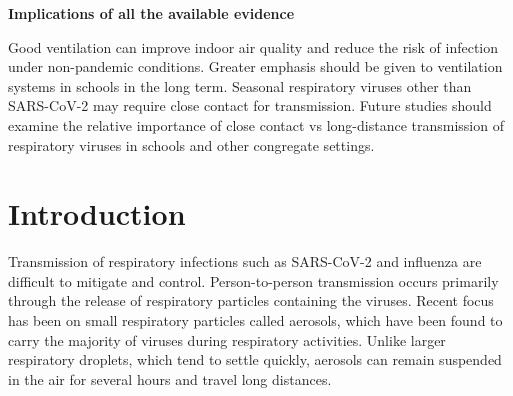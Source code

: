 \documentclass[fleqn,11pt]{wlscirep}
\begin{document}
\noindent \textbf{Implications of all the available evidence} \smallskip

\noindent Good ventilation can improve indoor air quality and reduce the risk of infection under non-pandemic conditions. Greater emphasis should be given to ventilation systems in schools in the long term. Seasonal respiratory viruses other than SARS-CoV-2 may require  close contact for transmission. Future studies should examine the relative importance of close contact vs long-distance transmission of respiratory viruses in schools and other congregate settings.

\thispagestyle{empty}
\sloppy
\raggedbottom

\newpage

\setcounter{page}{1}

\section{Introduction} 

Transmission of respiratory infections such as SARS-CoV-2 and influenza are difficult to mitigate and control. Person-to-person transmission occurs primarily through the release of respiratory particles containing the viruses. Recent focus has been on small respiratory particles called aerosols, which have been found to carry the majority of viruses during respiratory activities\cite{Fennelly2020}. Unlike larger respiratory droplets, which tend to settle quickly, aerosols can remain suspended in the air for several hours and travel long distances\cite{Coleman2022,Wang2020,Heneghan2021}.
\end{document}

